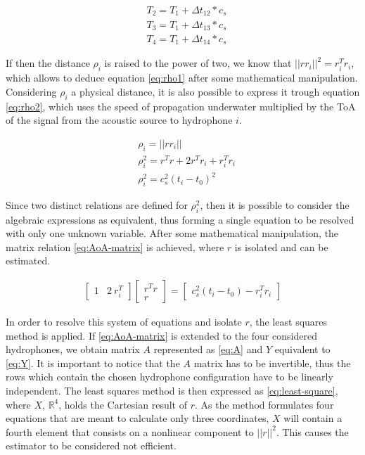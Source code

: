 \begin{eqnarray}
& T_2 = T_1 + \Delta t_{12} * c_s
\label{eq:toa_relation2}\\
& T_3 = T_1 + \Delta t_{13} * c_s
\label{eq:toa_relation3}\\
& T_4 = T_1 + \Delta t_{14} * c_s
\label{eq:toa_relation4}
\end{eqnarray}

If then the distance $\rho_i$ is raised to the power of two, we know that $||rr_i||^2 = r_i^{T}r_i$, which allows to deduce equation \ref{eq:rho1} after some mathematical manipulation. Considering $\rho_i$ a physical distance, it is also possible to express it trough equation \ref{eq:rho2}, which uses the speed of propagation underwater multiplied by the ToA of the signal from the acoustic source to hydrophone $i$.

\begin{eqnarray}
& \rho_i = ||rr_i|| 
\label{eq:rho}\\
&\rho_i^{2} =  r^{T}r + 2r^{T}r_i + r_i^{T}r_i
\label{eq:rho1}\\
&\rho_i^{2} = c_s^{2} (t_i-t_0)^{2}
\label{eq:rho2}
\end{eqnarray}

Since two distinct relations are defined for $\rho_i^{2}$, then it is possible to consider the algebraic expressions as equivalent, thus forming a single equation to be resolved with only one unknown variable. After some mathematical manipulation, the matrix relation \ref{eq:AoA-matrix} is achieved, where $r$ is isolated and can be estimated.

\begin{eqnarray}
\begin{bmatrix}
1 & 2\: r_i^{T}
\end{bmatrix}
\begin{bmatrix}
r^{T} r \\
r
\end{bmatrix}
=  
\begin{bmatrix}
c_s^{2} (t_i-t_0) - r_i^{T} r_i
\end{bmatrix}
\label{eq:AoA-matrix}
\end{eqnarray}
 
In order to resolve this system of equations and isolate $r$, the least squares method is applied. If \ref{eq:AoA-matrix} is extended to the four considered hydrophones, we obtain matrix $A$ represented as \ref{eq:A} and $Y$ equivalent to \ref{eq:Y}. It is important to notice that the $A$ matrix has to be invertible, thus the rows which contain the chosen hydrophone configuration have to be linearly independent. The least squares method is then expressed as \ref{eq:least-square}, where $X$, $\mathbb{R}^{4}$, holds the Cartesian result of $r$. As the method formulates four equations that are meant to calculate only three coordinates, $X$ will contain a fourth element that consists on a nonlinear component to $||r||^{2}$. This causes the estimator to be considered not efficient.

